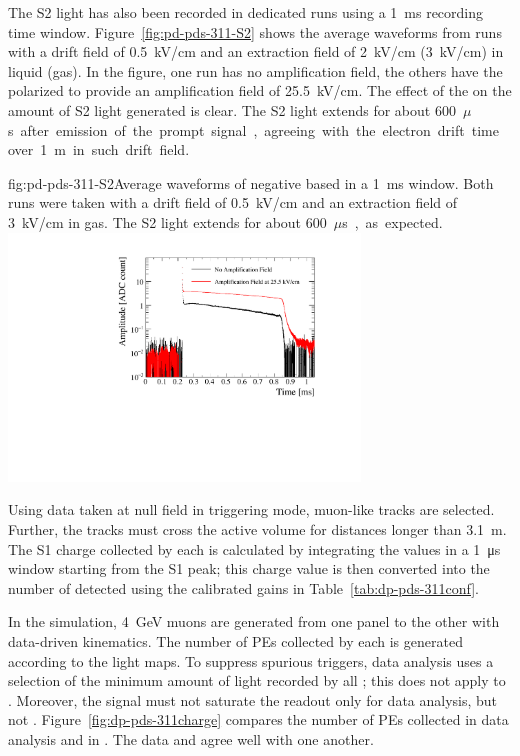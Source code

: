 The S2 light has also been recorded in dedicated runs using a \SI{1}{ms} recording time window.
Figure~\ref{fig:pd-pds-311-S2} shows the average waveforms from runs with a drift field of \SI{0.5}{kV/cm} and an extraction field of \SI{2}{kV/cm} (\SI{3}{kV/cm}) in liquid (gas). In the figure, one run has no amplification field, the others have the  polarized to provide an amplification field of \SI{25.5}{kV/cm}. 
The effect of the  on the amount of S2 light generated is clear. 
The S2 light extends for about \SI{600}{$\mu$s} after emission of the prompt signal, agreeing with the electron drift time over \SI{1}{m} in such drift field.

\begin{dunefigure}{fig:pd-pds-311-S2}{Average waveforms of negative based  in a \SI{1}{ms} window. Both runs were taken with a drift field of \SI{0.5}{kV/cm} and an extraction field of \SI{3}{kV/cm} in gas. The S2 light extends for about \SI{600}{$\mu$s}, as expected.}
\includegraphics[width=0.7\textwidth]{graphics/dppd_311_S2_extraction.pdf}
\end{dunefigure}
Using data taken at null field in  triggering mode, muon-like tracks are selected. Further, the tracks must cross the active volume for distances longer than \SI{3.1}{\m}. 
The S1 charge collected by each  is calculated by integrating the  values in a \SI{1}{\us} window starting from the S1 peak; this charge value is then converted into the number of detected  using the calibrated  gains in Table~\ref{tab:dp-pds-311conf}.

In the simulation, \SI{4}{\GeV} muons are generated from one  panel to the other with data-driven kinematics. The number of PEs collected by each  is generated according to the light maps. To suppress spurious triggers, data analysis uses a selection of the minimum amount of light recorded by all ; this does not apply to . Moreover, the  signal must not saturate the readout only for data analysis, but not . Figure~\ref{fig:dp-pds-311charge} compares the number of PEs collected in data analysis and in . The data and  agree well with one another. 

